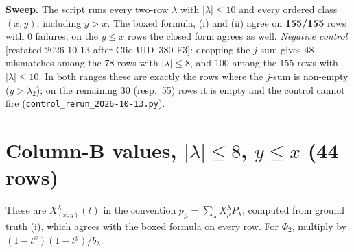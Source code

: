 \documentclass[10pt]{article}
\begin{document}
\textbf{Sweep.} The script runs every two-row $\lambda$ with $|\lambda|\le10$ and every ordered class $(x,y)$, including $y>x$.
The boxed formula, (i) and (ii) agree on \textbf{155/155} rows with 0 failures; on the $y\le x$ rows the closed form agrees as well.
\emph{Negative control} [restated 2026-10-13 after Clio UID~380 F3]: dropping the $j$-sum gives 48 mismatches among the 78 rows with $|\lambda|\le8$, and 100 among the 155 rows with $|\lambda|\le10$. In both ranges these are exactly the rows where the $j$-sum is non-empty ($y>\lambda_2$); on the remaining 30 (resp.\ 55) rows it is empty and the control cannot fire (\texttt{control\_rerun\_2026-10-13.py}).

\section{Column-B values, $|\lambda|\le8$, $y\le x$ (44 rows)}
These are $X^\lambda_{(x,y)}(t)$ in the convention $p_\mu=\sum_\lambda X^\lambda_\mu P_\lambda$, computed from ground truth (i), which agrees with the boxed formula on every row.
For $\Phi_2$, multiply by $(1-t^x)(1-t^y)/b_\lambda$.
\end{document}

